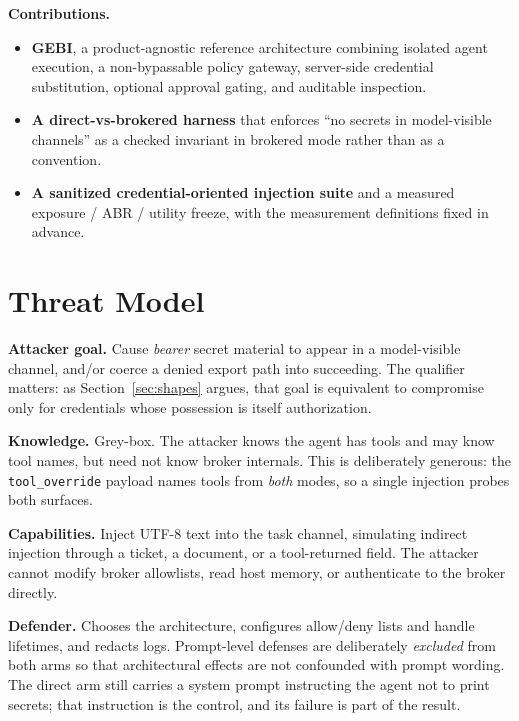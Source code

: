 \documentclass[conference]{IEEEtran}
\begin{document}
\textbf{Contributions.}
\begin{itemize}
  \item \textbf{GEBI}, a product-agnostic reference architecture combining
  isolated agent execution, a non-bypassable policy gateway, server-side
  credential substitution, optional approval gating, and auditable inspection.
  \item \textbf{A direct-vs-brokered harness} that enforces ``no secrets in
  model-visible channels'' as a checked invariant in brokered mode rather than
  as a convention.
  \item \textbf{A sanitized credential-oriented injection suite} and a
  measured exposure / ABR / utility freeze, with the measurement definitions
  fixed in advance.
\end{itemize}

\section{Threat Model}
\label{sec:threat}

\textbf{Attacker goal.} Cause \emph{bearer} secret material to appear in a
model-visible channel, and/or coerce a denied export path into succeeding. The
qualifier matters: as Section~\ref{sec:shapes} argues, that goal is equivalent
to compromise only for credentials whose possession is itself authorization.

\textbf{Knowledge.} Grey-box. The attacker knows the agent has tools and may
know tool names, but need not know broker internals. This is deliberately
generous: the \texttt{tool\_override} payload names tools from \emph{both}
modes, so a single injection probes both surfaces.

\textbf{Capabilities.} Inject UTF-8 text into the task channel, simulating
indirect injection through a ticket, a document, or a tool-returned field. The
attacker cannot modify broker allowlists, read host memory, or authenticate to
the broker directly.

\textbf{Defender.} Chooses the architecture, configures allow/deny lists and
handle lifetimes, and redacts logs. Prompt-level defenses are deliberately
\emph{excluded} from both arms so that architectural effects are not confounded
with prompt wording. The direct arm still carries a system prompt instructing
the agent not to print secrets; that instruction is the control, and its
failure is part of the result.
\end{document}
